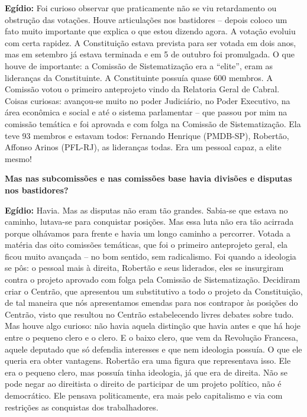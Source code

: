 \textbf{Egídio:} Foi curioso observar que praticamente não se viu
retardamento ou obstrução das votações. Houve articulações nos
bastidores -- depois coloco um fato muito importante que explica o que
estou dizendo agora. A votação evoluiu com certa rapidez. A Constituição
estava prevista para ser votada em dois anos, mas em setembro já estava
terminada e em 5 de outubro foi promulgada. O que houve de importante: a
Comissão de Sistematização era a ``elite'', eram as lideranças da
Constituinte. A Constituinte possuía quase 600 membros. A Comissão votou
o primeiro anteprojeto vindo da Relatoria Geral de Cabral. Coisas
curiosas: avançou-se muito no poder Judiciário, no Poder Executivo, na
área econômica e social e até o sistema parlamentar -- que passou por
mim na comissão temática e foi aprovada e com folga na Comissão de
Sistematização. Ela teve 93 membros e estavam todos: Fernando Henrique
(PMDB-SP), Robertão, Affonso Arinos (PFL-RJ), as lideranças todas. Era
um pessoal capaz, a elite mesmo!

\textbf{Mas nas subcomissões e nas comissões base havia divisões e
disputas nos bastidores?}

\textbf{Egídio:} Havia. Mas as disputas não eram tão grandes. Sabia-se
que estava no caminho, lutava-se para conquistar posições. Mas essa luta
não era tão acirrada porque olhávamos para frente e havia um longo
caminho a percorrer. Votada a matéria das oito comissões temáticas, que
foi o primeiro anteprojeto geral, ela ficou muito avançada -- no bom
sentido, sem radicalismo. Foi quando a ideologia se pôs: o pessoal mais
à direita, Robertão e seus liderados, eles se insurgiram contra o
projeto aprovado com folga pela Comissão de Sistematização. Decidiram
criar o Centrão, que apresentou um substitutivo a todo o projeto da
Constituição, de tal maneira que nós apresentamos emendas para nos
contrapor às posições do Centrão, visto que resultou no Centrão
estabelecendo livres debates sobre tudo. Mas houve algo curioso: não
havia aquela distinção que havia antes e que há hoje entre o pequeno
clero e o clero. E o baixo clero, que vem da Revolução Francesa, aquele
deputado que só defendia interesses e que nem ideologia possuía. O que
ele queria era obter vantagens. Robertão era uma figura que representava
isso. Ele era o pequeno clero, mas possuía tinha ideologia, já que era
de direita. Não se pode negar ao direitista o direito de participar de
um projeto político, não é democrático. Ele pensava politicamente, era
mais pelo capitalismo e via com restrições as conquistas dos
trabalhadores.


